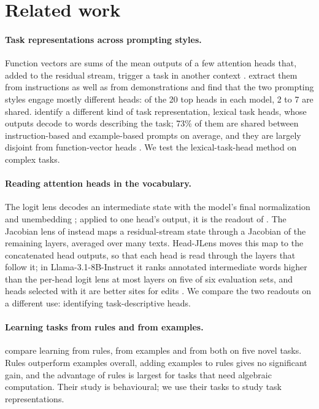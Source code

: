 \documentclass[11pt,a4paper]{article}
\begin{document}
\section{Related work}\label{sec:background}
\paragraph{Task representations across prompting styles.} Function vectors are sums of the mean outputs of a few attention heads that, added to the residual stream, trigger a task in another context \citep{todd2024function}. \citet{davidson2025different} extract them from instructions as well as from demonstrations and find that the two prompting styles engage mostly different heads: of the 20 top heads in each model, 2 to 7 are shared. \citet{yang2026shared} identify a different kind of task representation, lexical task heads, whose outputs decode to words describing the task; 73\% of them are shared between instruction-based and example-based prompts on average, and they are largely disjoint from function-vector heads \citep[App.~I]{yang2026shared}. We test the lexical-task-head method on complex tasks.

\paragraph{Reading attention heads in the vocabulary.} The logit lens decodes an intermediate state with the model's final normalization and unembedding \citep{nostalgebraist2020logitlens}; applied to one head's output, it is the readout of \citet{yang2026shared}. The Jacobian lens of \citet{gurnee2026workspace} instead maps a residual-stream state through a Jacobian of the remaining layers, averaged over many texts. Head-JLens moves this map to the concatenated head outputs, so that each head is read through the layers that follow it; in Llama-3.1-8B-Instruct it ranks annotated intermediate words higher than the per-head logit lens at most layers on five of six evaluation sets, and heads selected with it are better sites for edits \citep{merlo2026headjlens}. We compare the two readouts on a different use: identifying task-descriptive heads.

\paragraph{Learning tasks from rules and from examples.} \citet{fu2026rules} compare learning from rules, from examples and from both on five novel tasks. Rules outperform examples overall, adding examples to rules gives no significant gain, and the advantage of rules is largest for tasks that need algebraic computation. Their study is behavioural; we use their tasks to study task representations.
\end{document}
